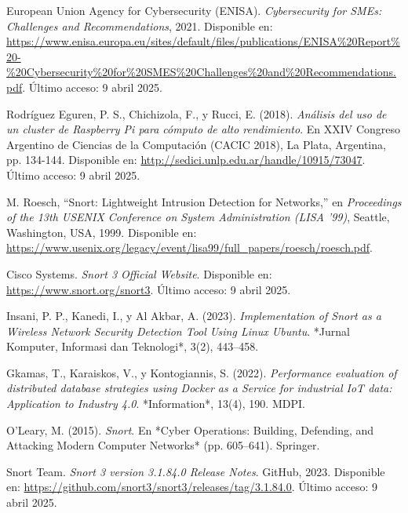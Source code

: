 \documentclass[11pt,a4paper,twoside]{report}
\begin{document}
\cleardoublepage
{}
\begin{thebibliography}{35}
		
	European Union Agency for Cybersecurity (ENISA). \textit{Cybersecurity for SMEs: Challenges and Recommendations}, 2021. Disponible en: \url{https://www.enisa.europa.eu/sites/default/files/publications/ENISA%20Report%20-%20Cybersecurity%20for%20SMES%20Challenges%20and%20Recommendations.pdf}. Último acceso: 9 abril 2025.
	
	Rodríguez Eguren, P. S., Chichizola, F., y Rucci, E. (2018). \textit{Análisis del uso de un cluster de Raspberry Pi para cómputo de alto rendimiento}. En XXIV Congreso Argentino de Ciencias de la Computación (CACIC 2018), La Plata, Argentina, pp. 134-144. Disponible en: \url{http://sedici.unlp.edu.ar/handle/10915/73047}. Último acceso: 9 abril 2025.
	
	M. Roesch, ``Snort: Lightweight Intrusion Detection for Networks,'' en \textit{Proceedings of the 13th USENIX Conference on System Administration (LISA '99)}, Seattle, Washington, USA, 1999. Disponible en: \url{https://www.usenix.org/legacy/event/lisa99/full_papers/roesch/roesch.pdf}.
	
	Cisco Systems. \textit{Snort 3 Official Website}. Disponible en: \url{https://www.snort.org/snort3}. Último acceso: 9 abril 2025.
	
	Insani, P. P., Kanedi, I., y Al Akbar, A. (2023). \textit{Implementation of Snort as a Wireless Network Security Detection Tool Using Linux Ubuntu}. *Jurnal Komputer, Informasi dan Teknologi*, 3(2), 443--458.
	
	Gkamas, T., Karaiskos, V., y Kontogiannis, S. (2022). \textit{Performance evaluation of distributed database strategies using Docker as a Service for industrial IoT data: Application to Industry 4.0}. *Information*, 13(4), 190. MDPI.
	
	O'Leary, M. (2015). \textit{Snort}. En *Cyber Operations: Building, Defending, and Attacking Modern Computer Networks* (pp. 605--641). Springer.
	
	Snort Team. \textit{Snort 3 version 3.1.84.0 Release Notes}. GitHub, 2023. Disponible en: \url{https://github.com/snort3/snort3/releases/tag/3.1.84.0}. Último acceso: 9 abril 2025.
	

\end{thebibliography}
\end{document}
